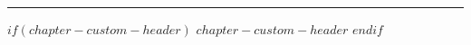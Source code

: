 \textcolor{primaryblue}{\rule{\textwidth}{2pt}}

$if(chapter-custom-header)$
$chapter-custom-header$
$endif$